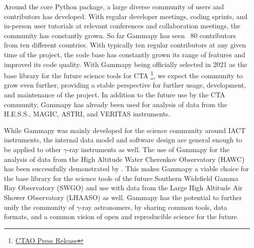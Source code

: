 \documentclass[longauth]{aa}
\newcommand{\gammapy}{Gammapy\xspace}
\newcommand{\hess}{H.E.S.S.\xspace}
\newcommand{\veritas}{VERITAS\xspace}
\newcommand{\magic}{MAGIC\xspace}
\newcommand{\astri}{ASTRI\xspace}
\newcommand{\gammaray}{$\gamma$-ray\xspace}
\begin{document}
Around the core Python package, a large diverse community of
users and contributors has developed. With regular developer meetings,
coding sprints, and in-person user tutorials at relevant conferences
and collaboration meetings, the community has constantly grown.
So far \gammapy has seen ~80 contributors from ten different countries.
With typically ten regular contributors at any given time of the
project, the code base has constantly grown its range of features
and improved its code quality. With \gammapy being officially selected
in 2021 as the base library for the future science tools for CTA
\footnote{\href{https://www.cta-observatory.org/ctao-adopts-the-gammapy-software-package-for-science-analysis/}{CTAO Press Release}},
we expect the community to grow
even further, providing a stable perspective for further usage,
development, and maintenance of the project. In addition to the future use
by the CTA community, \gammapy has already
been used for analysis of data from the \hess, \magic, \astri \citep[e.g.][]{Vercellone2022}, and \veritas instruments.

While \gammapy was mainly developed for the science community around
IACT instruments, the internal data model and software design are general
enough to be applied to other \gammaray instruments as well.
The use of \gammapy for the analysis of data from the High Altitude
Water Cherenkov Observatory (HAWC) has been successfully
demonstrated by \cite{Olivera2022}. This makes \gammapy
a viable choice for the base library for the science tools
of the future Southern Widefield Gamma Ray Observatory
(SWGO) and use with data from the Large High Altitude Air Shower Observatory (LHAASO) as well. \gammapy
has the potential to further unify the community
of \gammaray astronomers, by sharing common tools, data formats, and
a common vision of open and reproducible science for the future.
\end{document}
